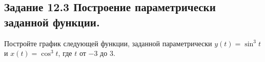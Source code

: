 \subsection*{\textbf{Задание 12.3} Построение параметрически заданной функции.}
Постройте график следующей функции, заданной параметрически
$y(t) = \sin^3 t$ и $x(t) = \cos^3 t$, где $t$ от $-3$ до $3$.

\begin{figure}[H]
    \renewcommand{\figurename}{Рисунок}
    \label{fig:image_12_3}
\end{figure}